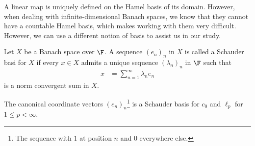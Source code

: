 \documentclass[10pt]{mypackage}
\begin{document}
A linear map is uniquely defined on the Hamel basis of its domain. However, when dealing with infinite-dimensional Banach spaces, we know that they cannot have a countable Hamel basis, which makes working with them very difficult. However, we can use a different notion of basis to assist us in our study.
\begin{definition}
  Let $X$ be a Banach space over $\F$. A sequence $\left(e_n\right)_n$ in $X$ is called a Schauder basi for $X$ if every $x\in X$ admits a unique sequence $\left(\lambda_n\right)_n$ in $\F$ such that
  \begin{align*}
    x &= \sum_{n=1}^{\infty}\lambda_ne_n
  \end{align*}
  is a norm convergent sum in $X$.
\end{definition}
\begin{proposition}
  The canonical coordinate vectors $\left(e_n\right)_n$\footnote{The sequence with $1$ at position $n$ and $0$ everywhere else.} is a Schauder basis for $c_0$ and $\ell_p$ for $1 \leq p < \infty$.
\end{proposition}
\end{document}
